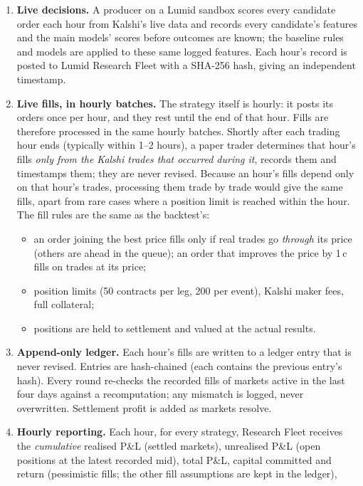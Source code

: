 \documentclass[11pt,a4paper]{article}
\begin{document}
\begin{enumerate}[leftmargin=*]
  \item \textbf{Live decisions.} A producer on a Lumid sandbox scores every candidate order each hour from Kalshi's
    live data and records every candidate's features and the main models' scores before outcomes are known; the
    baseline rules and models are applied to these same logged features. Each hour's record is posted to Lumid
    Research Fleet with a SHA-256 hash, giving an independent timestamp.
  \item \textbf{Live fills, in hourly batches.} The strategy itself is hourly: it posts its orders once per hour,
    and they rest until the end of that hour. Fills are therefore processed in the same hourly batches. Shortly
    after each trading hour ends (typically within 1--2 hours), a paper trader determines that hour's fills
    \emph{only from the Kalshi trades that occurred during it}, records them and timestamps them; they are never
    revised. Because an hour's fills depend only on that hour's trades, processing them trade by trade would give
    the same fills, apart from rare cases where a position limit is reached within the hour. The fill rules are the
    same as the backtest's:
    \begin{itemize}
      \item an order joining the best price fills only if real trades go \emph{through} its price (others are ahead
        in the queue); an order that improves the price by 1\,c fills on trades at its price;
      \item position limits (50 contracts per leg, 200 per event), Kalshi maker fees, full collateral;
      \item positions are held to settlement and valued at the actual results.
    \end{itemize}
  \item \textbf{Append-only ledger.} Each hour's fills are written to a ledger entry that is never revised. Entries
    are hash-chained (each contains the previous entry's hash). Every round re-checks the recorded fills of markets
    active in the last four days against a recomputation; any mismatch is logged, never overwritten. Settlement
    profit is added as markets resolve.
  \item \textbf{Hourly reporting.} Each hour, for every strategy, Research Fleet receives the
    \emph{cumulative} realised P\&L (settled markets), unrealised P\&L (open positions at the latest recorded mid),
    total P\&L, capital committed and return (pessimistic fills; the other fill assumptions are kept in the ledger),

\end{enumerate}
\end{document}
